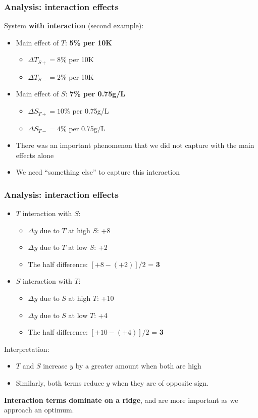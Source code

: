 \begin{frame}\frametitle{Analysis: interaction effects}

	System \textbf{with interaction} (second example):
	\begin{itemize}
		\item	Main effect of $T$: \textbf{5\% per 10K}
		\begin{itemize}
			\item	$\Delta T_{S+} = 8\%$ per 10K
			\item	$\Delta T_{S-} = 2\%$ per 10K
		\end{itemize}
		\item	Main effect of $S$: \textbf{7\% per 0.75g/L}
		\begin{itemize}
			\item	$\Delta S_{T+} = 10\%$ per 0.75g/L
			\item	$\Delta S_{T-} = 4\%$ per 0.75g/L
		\end{itemize}
		\item	There was an important phenomenon that we did not capture with the main effects alone
		\item	We need ``something else'' to capture this interaction
	\end{itemize}
\end{frame}

\begin{frame}\frametitle{Analysis: interaction effects}
	\begin{itemize}
		\item	$T$ interaction with $S$:
		\begin{itemize}
			\item	$\Delta y$ due to $T$ at high $S$: +8
			\item	$\Delta y$ due to $T$ at low $S$: +2
			\item	The half difference: $[+8 - (+2)]/2$ = \textbf{3}
		\end{itemize}
		\item	$S$ interaction with $T$:
		\begin{itemize}
			\item	$\Delta y$ due to $S$ at high $T$: +10
			\item	$\Delta y$ due to $S$ at low $T$: +4
			\item	The half difference: $[+10 - (+4)]/2$ = \textbf{3}
		\end{itemize}
	\end{itemize}

	Interpretation:
	\begin{itemize}
		\item	$T$ and $S$ increase $y$ by a greater amount when both are high
		\item	Similarly, both terms reduce $y$ when they are of opposite sign.
	\end{itemize}

	\textbf{Interaction terms dominate on a ridge}, and are more important as we approach an optimum.
\end{frame}

